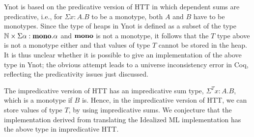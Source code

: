 Ynot is based on the predicative version of HTT\cite{nanevski06separation} in
which dependent sums are predicative, i.e., for $\Sigma x : A. B$ to be a
monotype, both $A$ and $B$ have to be monotypes. Since the type of heaps in Ynot is defined as a subset of the type $\mathbb{N} \times \Sigma \alpha : \mathbf{mono}.
\alpha$ and $\mathbf{mono}$ is not a monotype, it follows that the $T$ type above is not a monotype either and that values of type $T$ cannot be stored in
the heap. It is thus unclear whether it is possible to give an implementation
of the above type in Ynot; the obvious attempt leads to a universe
inconsistency error in Coq, reflecting the predicativity issues just
discussed. 

The impredicative version of HTT \cite{petersen08} has an impredicative sum
type, $\Sigma^T x : A. B$, which is a monotype if $B$ is. Hence, in the
impredicative version of HTT, we can store values of type $T$, by using
impredicative sums. We conjecture that the implementation derived from
translating the Idealized ML implementation has the above 
type in impredicative HTT.



